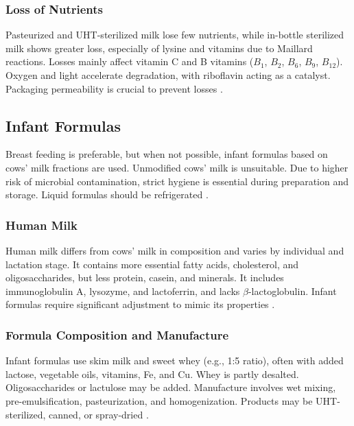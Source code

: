 \subsubsection*{Loss of Nutrients}
Pasteurized and UHT-sterilized milk lose few nutrients, while in-bottle sterilized milk shows greater loss, especially of lysine and vitamins due to Maillard reactions. Losses mainly affect vitamin C and B vitamins ($B_1$, $B_2$, $B_6$, $B_9$, $B_12$). Oxygen and light accelerate degradation, with riboflavin acting as a catalyst. Packaging permeability is crucial to prevent losses \cite*{curr_rm_01_dairy_science_technology}.

\subsection{Infant Formulas}
Breast feeding is preferable, but when not possible, infant formulas based on cows' milk fractions are used. Unmodified cows' milk is unsuitable. Due to higher risk of microbial contamination, strict hygiene is essential during preparation and storage. Liquid formulas should be refrigerated \cite*{curr_rm_01_dairy_science_technology}.

\subsubsection*{Human Milk}
Human milk differs from cows’ milk in composition and varies by individual and lactation stage. It contains more essential fatty acids, cholesterol, and oligosaccharides, but less protein, casein, and minerals. It includes immunoglobulin A, lysozyme, and lactoferrin, and lacks $\beta$-lactoglobulin. Infant formulas require significant adjustment to mimic its properties \cite*{curr_rm_01_dairy_science_technology}.

\subsubsection*{Formula Composition and Manufacture}
Infant formulas use skim milk and sweet whey (e.g., 1:5 ratio), often with added lactose, vegetable oils, vitamins, Fe, and Cu. Whey is partly desalted. Oligosaccharides or lactulose may be added. Manufacture involves wet mixing, pre-emulsification, pasteurization, and homogenization. Products may be UHT-sterilized, canned, or spray-dried \cite*{curr_rm_01_dairy_science_technology}.


